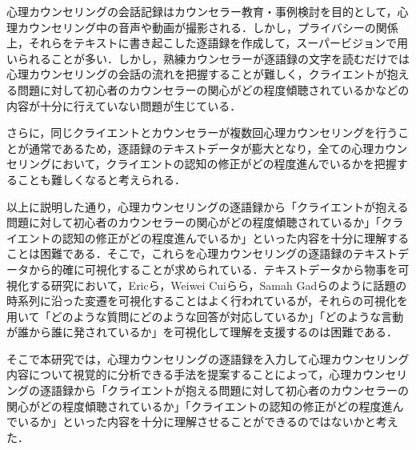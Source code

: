 \documentclass[shuuron]{kuee}
\begin{document}
心理カウンセリングの会話記録はカウンセラー教育・事例検討を目的として，心理カウンセリング中の音声や動画が撮影される．しかし，プライバシーの関係上，それらをテキストに書き起こした逐語録を作成して，スーパービジョンで用いられることが多い．しかし，熟練カウンセラーが逐語録の文字を読むだけでは心理カウンセリングの会話の流れを把握することが難しく，クライエントが抱える問題に対して初心者のカウンセラーの関心がどの程度傾聴されているかなどの内容が十分に行えていない問題が生じている．


さらに，同じクライエントとカウンセラーが複数回心理カウンセリングを行うことが通常であるため，逐語録のテキストデータが膨大となり，全ての心理カウンセリングにおいて，クライエントの認知の修正がどの程度進んでいるかを把握することも難しくなると考えられる．%


以上に説明した通り，心理カウンセリングの逐語録から「クライエントが抱える問題に対して初心者のカウンセラーの関心がどの程度傾聴されているか」「クライエントの認知の修正がどの程度進んでいるか」といった内容を十分に理解することは困難である．そこで，これらを心理カウンセリングの逐語録のテキストデータから的確に可視化することが求められている．テキストデータから物事を可視化する研究において，Ericら\cite{taskdriven}，Weiwei Cuiら\cite{cui2011textflow}ら，Samah Gadら\cite{gad2015themedelta}のように話題の時系列に沿った変遷を可視化することはよく行われているが，それらの可視化を用いて「どのような質問にどのような回答が対応しているか」「どのような言動が誰から誰に発されているか」を可視化して理解を支援するのは困難である．

そこで本研究では，心理カウンセリングの逐語録を入力して心理カウンセリング内容について視覚的に分析できる手法を提案することによって，心理カウンセリングの逐語録から「クライエントが抱える問題に対して初心者のカウンセラーの関心がどの程度傾聴されているか」「クライエントの認知の修正がどの程度進んでいるか」といった内容を十分に理解させることができるのではないかと考えた．
\end{document}

